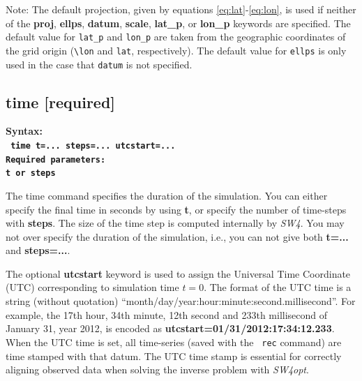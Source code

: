 \documentclass[11pt]{report}
\begin{document}
Note: The default projection, given by equations \eqref{eq:lat}-\eqref{eq:lon}, is used if neither
of the {\bf proj}, {\bf ellps}, {\bf datum}, {\bf scale}, {\bf lat\_p}, or {\bf lon\_p} keywords
are specified. The default value for \verb+lat_p+ and \verb+lon_p+ are taken from the geographic
coordinates of the grid origin (\verb+\lon+ and \verb+lat+, respectively). The default value for
\verb+ellps+ is only used in the case that \verb+datum+ is not specified.


\subsection{time [required]}
\begin{flushleft}
\bf Syntax:\\
\tt
time t=... steps=... utcstart=...\\
\bf Required parameters:\\
\tt t \rm or \tt steps
\end{flushleft}
The time command specifies the duration of the simulation. You can either specify the final time in
seconds by using {\bf t}, or specify the number of time-steps with {\bf steps}.  The size of the
time step is computed internally by \emph{SW4}. You may not over specify the duration of the
simulation, i.e., you can not give both {\bf t=...} and {\bf steps=...}.

The optional {\bf utcstart} keyword is used to assign the Universal Time Coordinate (UTC)
corresponding to simulation time $t=0$. The format of the UTC time is a string (without quotation)
``month/day/year:hour:minute:second.millisecond''. For example, the 17th hour, 34th minute, 12th
second and 233th millisecond of January 31, year 2012, is encoded as {\bf
  utcstart=01/31/2012:17:34:12.233}. When the UTC time is set, all time-series (saved with the {\tt
  rec} command) are time stamped with that datum. The UTC time stamp is essential for correctly
aligning observed data when solving the inverse problem with \emph{SW4opt}.
\end{document}
